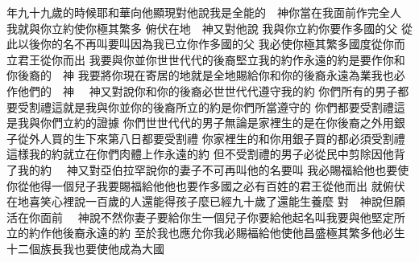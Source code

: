 \bchapter%
年九十九歲的時候\chientien 耶和華向他顯現\chientien 對他說\chientien 我是全能的　神\chientien 你當在我面前作完全人\chuan 
{}我就與你立約\chientien 使你極其繁多\chuan 
{}俯伏在地\chientien 　神又對他說\chientien 
{}我與你立約\chientien 你要作多國的父\chuan 
{}從此以後\chientien 你的名不再叫\chientien 要叫\chientien 因為我已立你作多國的父\chuan 
{}我必使你極其繁多\chientien 國度從你而立\chientien 君王從你而出\chuan 
{}我要與你並你世世代代的後裔堅立我的約\chientien 作永遠的約\chientien 是要作你和你後裔的　神\chuan 
{}我要將你現在寄居的地\chientien 就是全地\chientien 賜給你和你的後裔\chientien 永遠為業\yuentien 我也必作他們的　神\chuan\Chuan
{}　神又對說\chientien 你和你的後裔必世世代代遵守我的約\chuan 
{}你們所有的男子\chientien 都要受割禮\chientien 這就是我與你\chientien 並你的後裔所立的約\chientien 是你們所當遵守的\chuan 
{}你們都要受割禮\linebreak{}這是我與你們立約的證據\chuan 
{}你們世世代代的男子\chientien 無論是家裡生的\chientien 是在你後裔之外用銀子從外人買的\chientien 生下來第八日\chientien 都要受割禮\chuan 
{}你家裡生的\chientien 和你用銀子買的\chientien 都必須受割禮\yuentien 這樣\chientien 我的約就立在你們肉體上\chientien 作永遠的約\chuan 
{}但不受割禮的男子\chientien 必從民中剪除\chientien 因他背了我的約\chuan\Chuan
{}　神又對亞伯拉罕說\chientien{}你的妻子\chientien 不可再叫\chientien 他的名要叫\chuan 
{}我必賜福給他\chientien 也要使你從他得一個兒子\chientien 我要賜福給他\chientien 他也要作多國之\chientien 必有百姓的君王從他而出\chuan 
{}就俯伏在地喜笑\chientien 心裡說\chientien 一百歲的人\chientien 還能得孩子麼\yuentien{}已經九十歲了\chientien 還能生養麼\chuan 
{}對　神說\chientien 但願活在你面前\chuan 
{}　神說\chientien 不然\chientien 你妻子要給你生一個兒子\chientien 你要給他起名叫\chientien 我要與他堅定所立的約\chientien 作他後裔永遠的約\chuan 
{}至於\chientien 我也應允你\chientien 我必賜福給他\chientien 使他昌盛極其繁多\chientien 他必生十二個族長\chientien 我也要使他成為大國\chuan 
